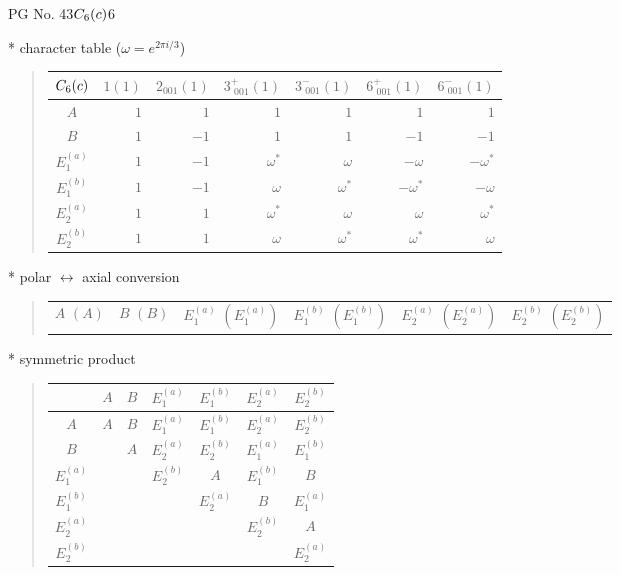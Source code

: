 \documentclass[fleqn,8pt,landscape]{jsarticle}
\begin{document}
\setcounter{MaxMatrixCols}{32}

\renewcommand{\tablename}{Table~}
\renewcommand{\figurename}{Figure~}
\begin{center}
\LARGE
PG No. 43\quad$C_{\rm 6}(c)$\quad$6$\quad[ hexagonal ]
\end{center}

* character table ($\omega=e^{2\pi i/3}$)
\begin{quote}
\begin{tabular}{crrrrrr} \hline \hline
$ C_{\rm 6}(c) $ & $ 1(1) $ & $ 2{}_{001}(1) $ & $ 3^{+}_{\,\,001}(1) $ & $ 3^{-}_{\,\,001}(1) $ & $ 6^{+}_{\,\,001}(1) $ & $ 6^{-}_{\,\,001}(1) $ \\ \hline
$ A $ & $ 1 $ & $ 1 $ & $ 1 $ & $ 1 $ & $ 1 $ & $ 1 $ \\
$ B $ & $ 1 $ & $ -1 $ & $ 1 $ & $ 1 $ & $ -1 $ & $ -1 $ \\
$ E_{1}^{(a)} $ & $ 1 $ & $ -1 $ & $ \omega^{*} $ & $ \omega $ & $ - \omega $ & $ - \omega^{*} $ \\
$ E_{1}^{(b)} $ & $ 1 $ & $ -1 $ & $ \omega $ & $ \omega^{*} $ & $ - \omega^{*} $ & $ - \omega $ \\
$ E_{2}^{(a)} $ & $ 1 $ & $ 1 $ & $ \omega^{*} $ & $ \omega $ & $ \omega $ & $ \omega^{*} $ \\
$ E_{2}^{(b)} $ & $ 1 $ & $ 1 $ & $ \omega $ & $ \omega^{*} $ & $ \omega^{*} $ & $ \omega $ \\
 \hline \hline
\end{tabular}
\end{quote}

* polar $\leftrightarrow$ axial conversion
\begin{quote}
\begin{tabular}{cccccc}
$ A\,\,(A) $ & $ B\,\,(B) $ & $ E_{1}^{(a)}\,\,(E_{1}^{(a)}) $ & $ E_{1}^{(b)}\,\,(E_{1}^{(b)}) $ & $ E_{2}^{(a)}\,\,(E_{2}^{(a)}) $ & $ E_{2}^{(b)}\,\,(E_{2}^{(b)}) $
\end{tabular}
\end{quote}

* symmetric product
\begin{quote}
\begin{tabular}{c|cccccc} \hline \hline
 & $ A $ & $ B $ & $ E_{1}^{(a)} $ & $ E_{1}^{(b)} $ & $ E_{2}^{(a)} $ & $ E_{2}^{(b)} $ \\ \hline
$ A $ & $ A $ & $ B $ & $ E_{1}^{(a)} $ & $ E_{1}^{(b)} $ & $ E_{2}^{(a)} $ & $ E_{2}^{(b)} $ \\
$ B $ & $  $ & $ A $ & $ E_{2}^{(a)} $ & $ E_{2}^{(b)} $ & $ E_{1}^{(a)} $ & $ E_{1}^{(b)} $ \\
$ E_{1}^{(a)} $ & $  $ & $  $ & $ E_{2}^{(b)} $ & $ A $ & $ E_{1}^{(b)} $ & $ B $ \\
$ E_{1}^{(b)} $ & $  $ & $  $ & $  $ & $ E_{2}^{(a)} $ & $ B $ & $ E_{1}^{(a)} $ \\
$ E_{2}^{(a)} $ & $  $ & $  $ & $  $ & $  $ & $ E_{2}^{(b)} $ & $ A $ \\
$ E_{2}^{(b)} $ & $  $ & $  $ & $  $ & $  $ & $  $ & $ E_{2}^{(a)} $ \\
 \hline \hline
\end{tabular}
\end{quote}
\end{document}
